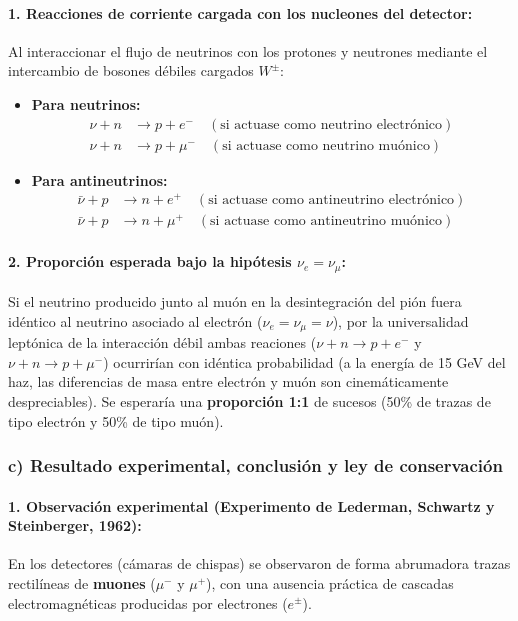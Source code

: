\begin{problema}
\paragraph{1. Reacciones de corriente cargada con los nucleones del detector:}
Al interaccionar el flujo de neutrinos con los protones y neutrones mediante el intercambio de bosones débiles cargados $W^\pm$:
\begin{itemize}
    \item \textbf{Para neutrinos:}
    \begin{align*}
    \nu + n &\longrightarrow p + e^- \quad (\text{si actuase como neutrino electrónico}) \\
    \nu + n &\longrightarrow p + \mu^- \quad (\text{si actuase como neutrino muónico})
    \end{align*}
    \item \textbf{Para antineutrinos:}
    \begin{align*}
    \bar{\nu} + p &\longrightarrow n + e^+ \quad (\text{si actuase como antineutrino electrónico}) \\
    \bar{\nu} + p &\longrightarrow n + \mu^+ \quad (\text{si actuase como antineutrino muónico})
    \end{align*}
\end{itemize}

\paragraph{2. Proporción esperada bajo la hipótesis $\nu_e = \nu_\mu$:}
Si el neutrino producido junto al muón en la desintegración del pión fuera idéntico al neutrino asociado al electrón ($\nu_e = \nu_\mu = \nu$), por la universalidad leptónica de la interacción débil ambas reaciones ($\nu + n \to p + e^-$ y $\nu + n \to p + \mu^-$) ocurrirían con idéntica probabilidad (a la energía de 15 GeV del haz, las diferencias de masa entre electrón y muón son cinemáticamente despreciables). Se esperaría una \textbf{proporción 1:1} de sucesos (50\% de trazas de tipo electrón y 50\% de tipo muón).

\subsubsection*{c) Resultado experimental, conclusión y ley de conservación}

\paragraph{1. Observación experimental (Experimento de Lederman, Schwartz y Steinberger, 1962):}
En los detectores (cámaras de chispas) se observaron de forma abrumadora trazas rectilíneas de \textbf{muones} ($\mu^-$ y $\mu^+$), con una ausencia práctica de cascadas electromagnéticas producidas por electrones ($e^\pm$).


\end{problema}
